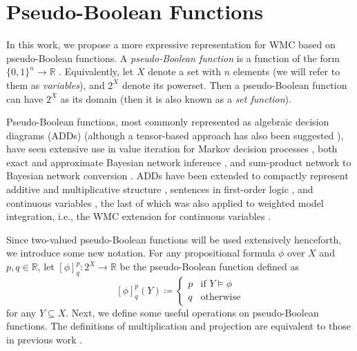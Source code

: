 \section{Pseudo-Boolean Functions}

In this work, we propose a more expressive representation for WMC based on
pseudo-Boolean functions. A \emph{pseudo-Boolean function} is a function of the
form $\{ 0, 1 \}^n \to \mathbb{R}$ \citep{DBLP:journals/dam/BorosH02}.
Equivalently, let $X$ denote a set with $n$ elements (we will refer to them as
\emph{variables}), and $2^X$ denote its powerset. Then a pseudo-Boolean function
can have $2^X$ as its domain (then it is also known as a \emph{set function}).

Pseudo-Boolean functions, most commonly represented as
algebraic decision diagrams (ADDs) \citep{DBLP:journals/fmsd/BaharFGHMPS97}
(although a tensor-based approach has also been suggested
\citep{DBLP:journals/corr/abs-1908-04381,DBLP:conf/cp/DudekPV20}), have seen
extensive use in value iteration for Markov decision processes
\citep{DBLP:conf/uai/HoeySHB99}, both exact and approximate Bayesian network
inference \citep{DBLP:conf/ijcai/ChaviraD07,DBLP:conf/uai/GogateD11}, and
sum-product network \citep{DBLP:conf/uai/PoonD11} to Bayesian network conversion
\citep{DBLP:conf/icml/ZhaoMP15}. ADDs have been extended to compactly represent
additive and multiplicative structure \citep{DBLP:conf/ijcai/SannerM05},
sentences in first-order logic \citep{DBLP:journals/ai/SannerB09}, and continuous
variables \citep{DBLP:conf/uai/SannerDB11}, the last of which was also applied to
weighted model integration, i.e., the WMC extension for continuous variables
\citep{DBLP:conf/ijcai/BellePB15,DBLP:conf/ijcai/KolbMSBK18}.

Since two-valued pseudo-Boolean functions will be used extensively henceforth,
we introduce some new notation. For any propositional formula $\phi$ over $X$
and $p, q \in \mathbb{R}$, let $[\phi]^p_q\colon 2^X \to \mathbb{R}$ be the
pseudo-Boolean function defined as
\[
  [\phi]^p_q(Y) \coloneqq
  \begin{cases}
    p & \text{if } Y \models \phi \\
    q & \text{otherwise}
  \end{cases}
\]
for any $Y \subseteq X$. Next, we define some useful operations on
pseudo-Boolean functions. The definitions of multiplication and projection are
equivalent to those in previous work
\citep{DBLP:conf/aaai/DudekPV20,DBLP:conf/cp/DudekPV20}.

